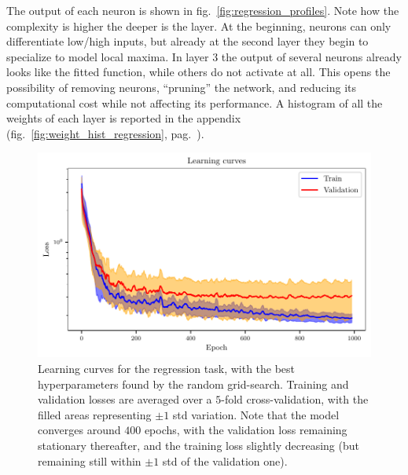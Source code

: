 \documentclass[11pt,a4paper]{scrartcl}
\newcommand{\q}[1]{``#1''}
\begin{document}
\medskip

The output of each neuron is shown in fig.~\ref{fig:regression_profiles}. Note how the complexity is higher the deeper is the layer. At the beginning, neurons can only differentiate low/high inputs, but already at the second layer they begin to specialize to model local maxima. In layer $3$ the output of several neurons already looks like the fitted function, while others do not activate at all. This opens the possibility of removing neurons, \q{pruning} the network, and reducing its computational cost while not affecting its performance. A histogram of all the weights of each layer is reported in the appendix (fig.~\ref{fig:weight_hist_regression}, pag.~\pageref{fig:weight_hist_regression}).

\begin{figure}[H]
    \centering
    \includegraphics{../01_Regression/Plots/learning_curves.pdf}
    \caption{Learning curves for the regression task, with the best hyperparameters found by the random grid-search. Training and validation losses are averaged over a $5$-fold cross-validation, with the filled areas representing $\pm 1$ std variation. Note that the model converges around $400$ epochs, with the validation loss remaining stationary thereafter, and the training loss slightly decreasing (but remaining still within $\pm 1$ std of the validation one).\label{fig:learning_curves}}
\end{figure}
\end{document}
